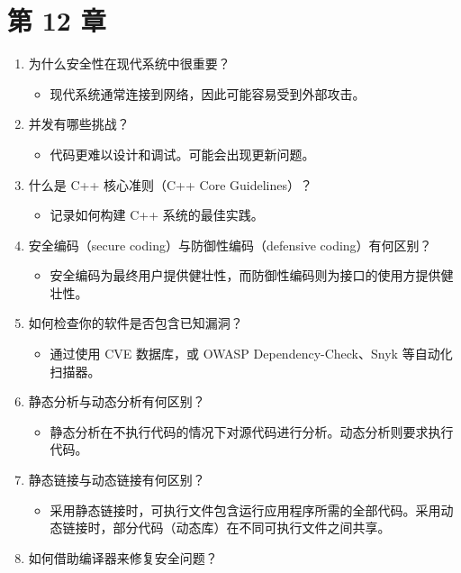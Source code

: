 \section*{第 12 章}

\begin{enumerate}
\item 为什么安全性在现代系统中很重要？

\begin{itemize}
\item 现代系统通常连接到网络，因此可能容易受到外部攻击。
\end{itemize}
\item 并发有哪些挑战？

\begin{itemize}
\item 代码更难以设计和调试。可能会出现更新问题。
\end{itemize}
\item 什么是 C++ 核心准则（C++ Core Guidelines）？

\begin{itemize}
\item 记录如何构建 C++ 系统的最佳实践。
\end{itemize}
\item 安全编码（secure coding）与防御性编码（defensive coding）有何区别？

\begin{itemize}
\item 安全编码为最终用户提供健壮性，而防御性编码则为接口的使用方提供健壮性。
\end{itemize}
\item 如何检查你的软件是否包含已知漏洞？

\begin{itemize}
\item 通过使用 CVE 数据库，或 OWASP Dependency-Check、Snyk 等自动化扫描器。
\end{itemize}
\item 静态分析与动态分析有何区别？

\begin{itemize}
\item 静态分析在不执行代码的情况下对源代码进行分析。动态分析则要求执行代码。
\end{itemize}
\item 静态链接与动态链接有何区别？

\begin{itemize}
\item 采用静态链接时，可执行文件包含运行应用程序所需的全部代码。采用动态链接时，部分代码（动态库）在不同可执行文件之间共享。
\end{itemize}
\item 如何借助编译器来修复安全问题？


\end{enumerate}
